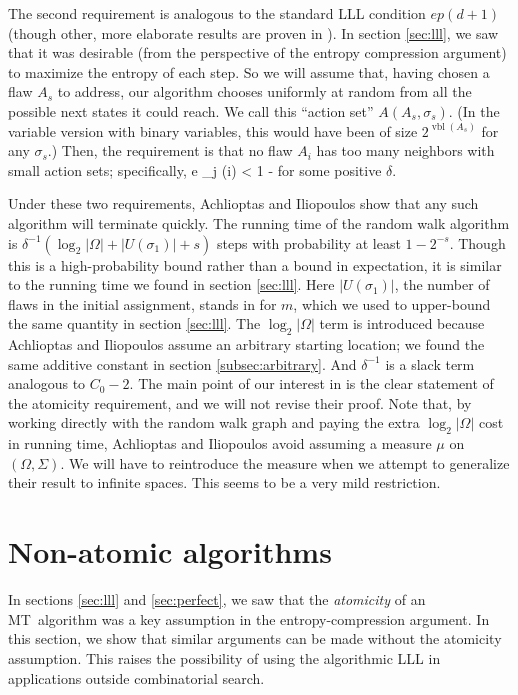\documentclass{article}
\newcommand{\mt}{MT~}
\def\seqn#1\eeqn{\begin{align}#1\end{align}}
\begin{document}
The second requirement is analogous to the standard LLL condition $e p (d+1)$ (though other, more elaborate results are proven in \cite{achlioptas2014random}).  In section \ref{sec:lll}, we saw that it was desirable (from the perspective of the entropy compression argument) to maximize the entropy of each step.  So we will assume that, having chosen a flaw $A_s$ to address, our algorithm chooses uniformly at random from all the possible next states it could reach.  We call this ``action set'' $A(A_s, \sigma_s)$.  (In the variable version with binary variables, this would have been of size $2^{\operatorname{vbl}(A_s)}$ for any $\sigma_s$.)  Then, the requirement is that no flaw $A_i$ has too many neighbors with small action sets; specifically,
\seqn
  \label{eqn:degree-req}
  e \sum_{j \in \Gamma(i)}  < 1 - \delta
\eeqn
for some positive $\delta$.

Under these two requirements, Achlioptas and Iliopoulos show that any such algorithm will terminate quickly.  The running time of the random walk algorithm is $\delta^{-1} (\log_2 |\Omega| + |U(\sigma_1)| + s)$ steps with probability at least $1 - 2^{-s}$.  Though this is a high-probability bound rather than a bound in expectation, it is similar to the running time we found in section \ref{sec:lll}.  Here $|U(\sigma_1)|$, the number of flaws in the initial assignment, stands in for $m$, which we used to upper-bound the same quantity in section \ref{sec:lll}.  The $\log_2 |\Omega|$ term is introduced because Achlioptas and Iliopoulos assume an arbitrary starting location; we found the same additive constant in section \ref{subsec:arbitrary}.  And $\delta^{-1}$ is a slack term analogous to $C_0 - 2$.
The main point of our interest in \cite{achlioptas2014random} is the clear statement of the atomicity requirement, and we will not revise their proof.  Note that, by working directly with the random walk graph and paying the extra $\log_2 |\Omega|$ cost in running time, Achlioptas and Iliopoulos avoid assuming a measure $\mu$ on $(\Omega, \Sigma)$.  We will have to reintroduce the measure when we attempt to generalize their result to infinite spaces.  This seems to be a very mild restriction.

\section{Non-atomic algorithms}
\label{sec:nonatomic-intro}
In sections \ref{sec:lll} and \ref{sec:perfect}, we saw that the \emph{atomicity} of an \mt algorithm was a key assumption in the entropy-compression argument.  In this section, we show that similar arguments can be made without the atomicity assumption.  This raises the possibility of using the algorithmic LLL in applications outside combinatorial search.
\end{document}
